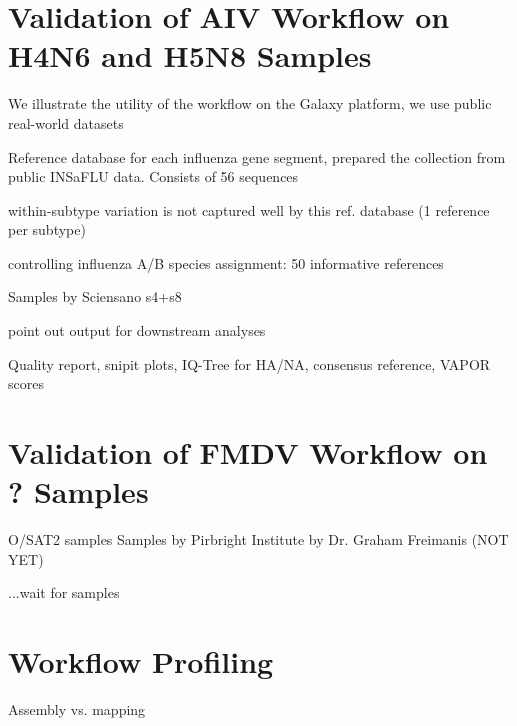 \section{Validation of AIV Workflow on H4N6 and H5N8 Samples}\label{sec:4-aiv}
\todoit

We illustrate the utility of the workflow on the Galaxy platform, we use public real-world datasets

Reference database for each influenza gene segment, prepared the collection from public INSaFLU data. Consists of 56 sequences

within-subtype variation is not captured well by this ref. database (1 reference per subtype)

controlling influenza A/B species assignment: 50 informative references

Samples by Sciensano s4+s8

point out output for downstream analyses 

Quality report, snipit plots, IQ-Tree for \ac{HA}/\ac{NA}, consensus reference, VAPOR scores

\section{Validation of FMDV Workflow on ? Samples}
O/SAT2 samples
\todoit
Samples by Pirbright Institute by Dr. Graham Freimanis (NOT YET)

...wait for samples

\section{Workflow Profiling}
\todoit
Assembly vs. mapping
 